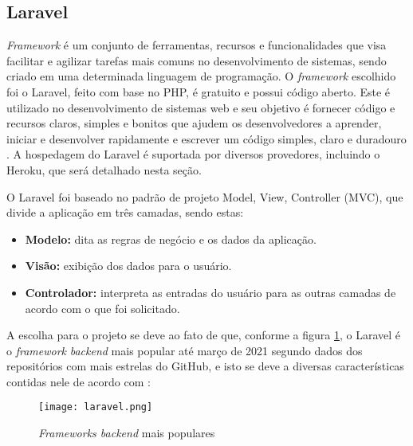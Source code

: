 \subsection{Laravel}
\textit{Framework} é um conjunto de ferramentas, recursos e funcionalidades que visa facilitar e agilizar tarefas mais comuns no desenvolvimento de sistemas, sendo criado em uma determinada linguagem de programação. O \textit{framework} escolhido foi o Laravel, feito com base no PHP, é gratuito e possui código aberto. Este é utilizado no desenvolvimento de sistemas web e seu objetivo é fornecer código e recursos claros, simples e bonitos que ajudem os desenvolvedores a aprender, iniciar e desenvolver rapidamente e escrever um código simples, claro e duradouro \cite{STAUFFER}. A hospedagem do Laravel é suportada por diversos provedores, incluindo o Heroku, que será detalhado nesta seção. 

O Laravel foi baseado no padrão de projeto Model, View, Controller (MVC), que divide a aplicação em três camadas, sendo estas:
\begin{itemize}
    \item \textbf{Modelo:} dita as regras de negócio e os dados da aplicação.
    \item \textbf{Visão:} exibição dos dados para o usuário.
    \item \textbf{Controlador:} interpreta as entradas do usuário para as outras camadas de acordo com o que foi solicitado.
\end{itemize}

A escolha para o projeto se deve ao fato de que, conforme a figura \ref{frameworkpopular}, o Laravel é o \textit{framework} \textit{backend} mais popular até março de 2021 segundo dados dos repositórios com mais estrelas do GitHub, e isto se deve a diversas características contidas nele de acordo com :

\begin{figure}[H]
    \caption{\label{frameworkpopular}\textit{Frameworks \textit{backend}} mais populares}
    \vspace{5pt}
    \centering
    \texttt{[image: laravel.png]}
    \vspace{5pt}
\end{figure}

